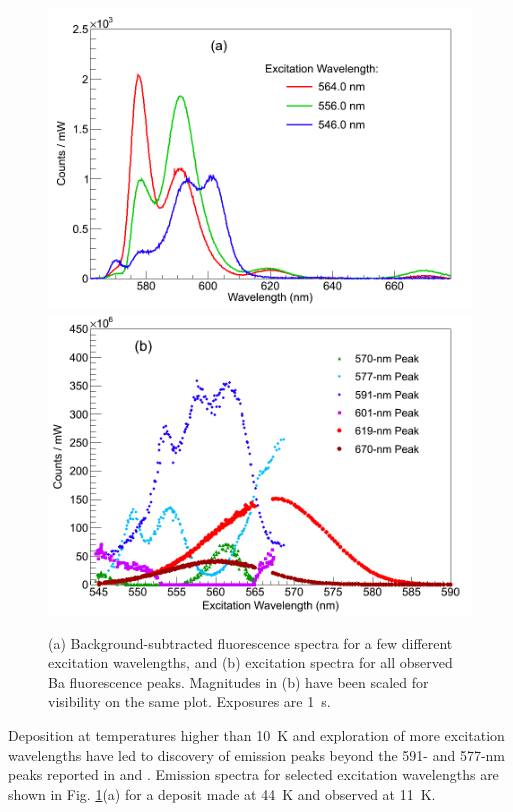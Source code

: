 \begin{figure} %
        \centering
                \includegraphics[width=.8\textwidth]{figures/excitspec_grn_spectra_v3.png}
                \includegraphics[width=.8\textwidth]{figures/excitspec_grn.png}
                \caption{(a) Background-subtracted fluorescence spectra for a few different excitation wavelengths, and (b) excitation spectra for all observed Ba fluorescence peaks.  Magnitudes in (b) have been scaled for visibility on the same plot.  Exposures are 1~s.}
\label{fig:excitspecGrn}
\end{figure}




Deposition at temperatures higher than 10~K and exploration of more excitation wavelengths have led to discovery of emission peaks beyond the 591- and 577-nm peaks reported in \cite{Shon} and \cite{Brian}.  Emission spectra for selected excitation wavelengths are shown in Fig. \ref{fig:excitspecGrn}(a) for a deposit made at 44~K and observed at 11~K.  

